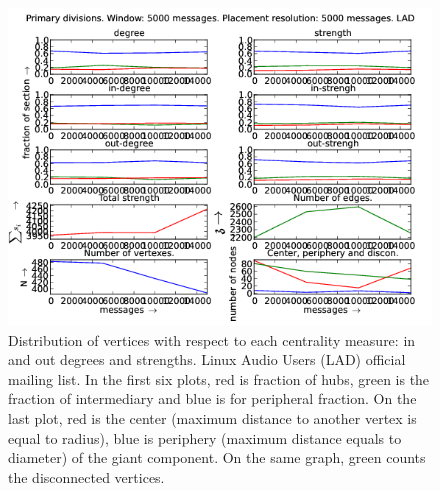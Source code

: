 \documentclass[%
 aip,
 jmp,%
 amsmath,amssymb,
 reprint,%
]{revtex4-1}
\begin{document}
\begin{figure}[hbtp] 
   \centering
        \includegraphics[width=\textwidth]{figs/LAD/5000}
    \caption{Distribution of vertices with respect to each centrality measure: in and out degrees and strengths. Linux Audio Users (LAD) official mailing list. In the first six plots, red is fraction of hubs, green is the fraction of intermediary and blue is for peripheral fraction. On the last plot, red is the center (maximum distance to another vertex is equal to radius), blue is periphery (maximum distance equals to diameter) of the giant component. On the same graph, green counts the disconnected vertices.}
    \label{fig:lad5000}
\end{figure}
\end{document}
